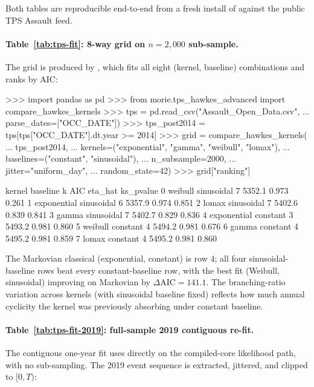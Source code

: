 \documentclass[article,shortnames,nojss]{jss}
\newcommand{\1}{\mathbbm{1}}
\theoremstyle{plain}
\theoremstyle{definition}
\begin{document}
Both tables are reproducible end-to-end from a fresh install of 
\citep{Ruhela2026MoriePy} against the public TPS Assault feed.

\paragraph{Table~\ref{tab:tps-fit}: 8-way grid on $n=2{,}000$ sub-sample.}
The grid is produced by , which fits
all eight (kernel, baseline) combinations and ranks by AIC:

\begin{CodeChunk}
\begin{CodeInput}
>>> import pandas as pd
>>> from morie.tps_hawkes_advanced import compare_hawkes_kernels
>>> tps = pd.read_csv("Assault_Open_Data.csv",
...                    parse_dates=["OCC_DATE"])
>>> tps_post2014 = tps[tps["OCC_DATE"].dt.year >= 2014]
>>> grid = compare_hawkes_kernels(
...     tps_post2014,
...     kernels=("exponential", "gamma", "weibull", "lomax"),
...     baselines=("constant", "sinusoidal"),
...     n_subsample=2000,
...     jitter="uniform_day",
...     random_state=42)
>>> grid["ranking"]
\end{CodeInput}
\begin{CodeOutput}
       kernel     baseline  k          AIC    eta_hat    ks_pvalue
0    weibull   sinusoidal   7      5352.1      0.973        0.261
1 exponential  sinusoidal   6      5357.9      0.974        0.851
2      lomax   sinusoidal   7      5402.6      0.839        0.841
3      gamma   sinusoidal   7      5402.7      0.829        0.836
4 exponential    constant   3      5493.2      0.981        0.860
5    weibull    constant   4      5494.2      0.981        0.676
6      gamma     constant   4      5495.2      0.981        0.859
7      lomax     constant   4      5495.2      0.981        0.860
\end{CodeOutput}
\end{CodeChunk}

The Markovian classical (exponential, constant) is row 4; all four
sinusoidal-baseline rows beat every constant-baseline row, with the
best fit (Weibull, sinusoidal) improving on Markovian by
$\Delta\mathrm{AIC} = 141.1$.  The branching-ratio variation across
kernels (with sinusoidal baseline fixed) reflects how much annual
cyclicity the kernel was previously absorbing under constant baseline.

\paragraph{Table~\ref{tab:tps-fit-2019}: full-sample 2019 contiguous re-fit.}
The contiguous one-year fit uses 
directly on the compiled-core likelihood path, with no
sub-sampling.  The 2019 event sequence is extracted, jittered, and
clipped to $[0, T)$:
\end{document}
